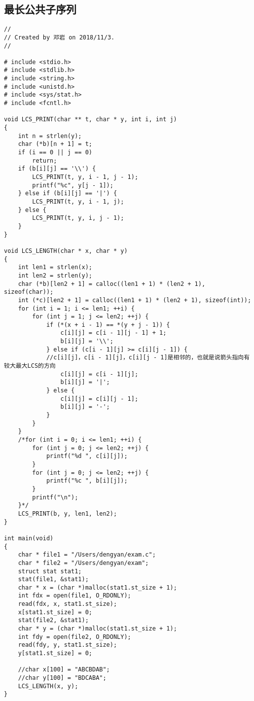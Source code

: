 \subsection{最长公共子序列}
\begin{verbatim}
//
// Created by 邓岩 on 2018/11/3.
//

# include <stdio.h>
# include <stdlib.h>
# include <string.h>
# include <unistd.h>
# include <sys/stat.h>
# include <fcntl.h>

void LCS_PRINT(char ** t, char * y, int i, int j)
{
    int n = strlen(y);
    char (*b)[n + 1] = t;
    if (i == 0 || j == 0)
        return;
    if (b[i][j] == '\\') {
        LCS_PRINT(t, y, i - 1, j - 1);
        printf("%c", y[j - 1]);
    } else if (b[i][j] == '|') {
        LCS_PRINT(t, y, i - 1, j);
    } else {
        LCS_PRINT(t, y, i, j - 1);
    }
}

void LCS_LENGTH(char * x, char * y)
{
    int len1 = strlen(x);
    int len2 = strlen(y);
    char (*b)[len2 + 1] = calloc((len1 + 1) * (len2 + 1), sizeof(char));
    int (*c)[len2 + 1] = calloc((len1 + 1) * (len2 + 1), sizeof(int));
    for (int i = 1; i <= len1; ++i) {
        for (int j = 1; j <= len2; ++j) {
            if (*(x + i - 1) == *(y + j - 1)) {
                c[i][j] = c[i - 1][j - 1] + 1;
                b[i][j] = '\\';
            } else if (c[i - 1][j] >= c[i][j - 1]) { 
            //c[i][j]，c[i - 1][j]，c[i][j - 1]是相邻的，也就是说箭头指向有较大最大LCS的方向
                c[i][j] = c[i - 1][j];
                b[i][j] = '|';
            } else {
                c[i][j] = c[i][j - 1];
                b[i][j] = '-';
            }
        }
    }
    /*for (int i = 0; i <= len1; ++i) {
        for (int j = 0; j <= len2; ++j) {
            printf("%d ", c[i][j]);
        }
        for (int j = 0; j <= len2; ++j) {
            printf("%c ", b[i][j]);
        }
        printf("\n");
    }*/
    LCS_PRINT(b, y, len1, len2);
}

int main(void)
{
    char * file1 = "/Users/dengyan/exam.c";
    char * file2 = "/Users/dengyan/exam";
    struct stat stat1;
    stat(file1, &stat1);
    char * x = (char *)malloc(stat1.st_size + 1);
    int fdx = open(file1, O_RDONLY);
    read(fdx, x, stat1.st_size);
    x[stat1.st_size] = 0;
    stat(file2, &stat1);
    char * y = (char *)malloc(stat1.st_size + 1);
    int fdy = open(file2, O_RDONLY);
    read(fdy, y, stat1.st_size);
    y[stat1.st_size] = 0;

    //char x[100] = "ABCBDAB";
    //char y[100] = "BDCABA";
    LCS_LENGTH(x, y);
}
\end{verbatim}